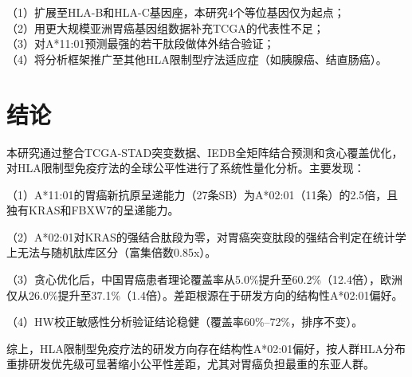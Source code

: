 \documentclass[12pt,a4paper]{ctexart}
\begin{document}
（1）扩展至HLA-B和HLA-C基因座，本研究4个等位基因仅为起点；\\
（2）用更大规模亚洲胃癌基因组数据补充TCGA的代表性不足；\\
（3）对A*11:01预测最强的若干肽段做体外结合验证；\\
（4）将分析框架推广至其他HLA限制型疗法适应症（如胰腺癌、结直肠癌）。

\newpage


\section{结论}

本研究通过整合TCGA-STAD突变数据、IEDB全矩阵结合预测和贪心覆盖优化，对HLA限制型免疫疗法的全球公平性进行了系统性量化分析。主要发现：

（1）A*11:01的胃癌新抗原呈递能力（27条SB）为A*02:01（11条）的2.5倍，且独有KRAS和FBXW7的呈递能力。

（2）A*02:01对KRAS的强结合肽段为零，对胃癌突变肽段的强结合判定在统计学上无法与随机肽库区分（富集倍数0.85x）。

（3）贪心优化后，中国胃癌患者理论覆盖率从5.0\%提升至60.2\%（12.4倍），欧洲仅从26.0\%提升至37.1\%（1.4倍）。差距根源在于研发方向的结构性A*02:01偏好。

（4）HW校正敏感性分析验证结论稳健（覆盖率60\%--72\%，排序不变）。

综上，HLA限制型免疫疗法的研发方向存在结构性A*02:01偏好，按人群HLA分布重排研发优先级可显著缩小公平性差距，尤其对胃癌负担最重的东亚人群。

\newpage

\end{document}
